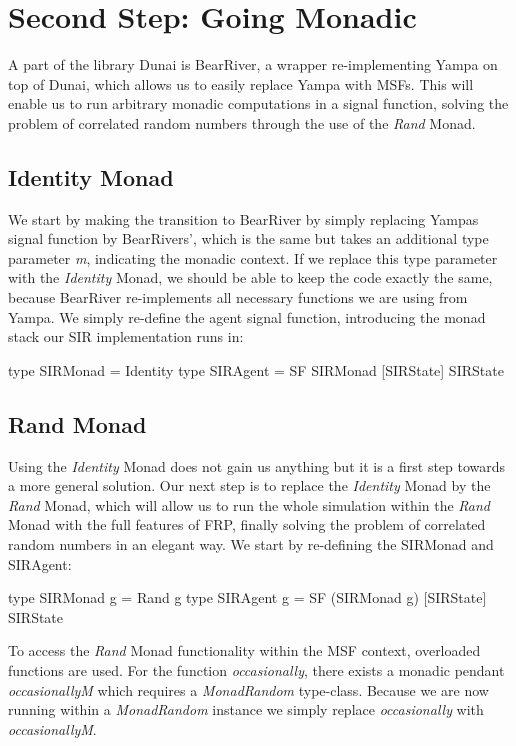 \section{Second Step: Going Monadic}
\label{sec:timedriven_monadic}

A part of the library Dunai is BearRiver, a wrapper re-implementing Yampa on top of Dunai, which allows us to easily replace Yampa with MSFs. This will enable us to run arbitrary monadic computations in a signal function, solving the problem of correlated random numbers through the use of the \textit{Rand} Monad.

\subsection{Identity Monad}
We start by making the transition to BearRiver by simply replacing Yampas signal function by BearRivers', which is the same but takes an additional type parameter \textit{m}, indicating the monadic context. If we replace this type parameter with the \textit{Identity} Monad, we should be able to keep the code exactly the same, because BearRiver re-implements all necessary functions we are using from Yampa. We simply re-define the agent signal function, introducing the monad stack our SIR implementation runs in:

\begin{HaskellCode}
type SIRMonad = Identity
type SIRAgent = SF SIRMonad [SIRState] SIRState
\end{HaskellCode}

\subsection{Rand Monad}
Using the \textit{Identity} Monad does not gain us anything but it is a first step towards a more general solution. Our next step is to replace the \textit{Identity} Monad by the \textit{Rand} Monad, which will allow us to run the whole simulation within the \textit{Rand} Monad with the full features of FRP, finally solving the problem of correlated random numbers in an elegant way. We start by re-defining the SIRMonad and SIRAgent:

\begin{HaskellCode}
type SIRMonad g = Rand g
type SIRAgent g = SF (SIRMonad g) [SIRState] SIRState
\end{HaskellCode}

To access the \textit{Rand} Monad functionality within the MSF context, overloaded functions are used. For the function \textit{occasionally}, there exists a monadic pendant \textit{occasionallyM} which requires a \textit{MonadRandom} type-class. Because we are now running within a \textit{MonadRandom} instance we simply replace \textit{occasionally} with \textit{occasionallyM}. 

